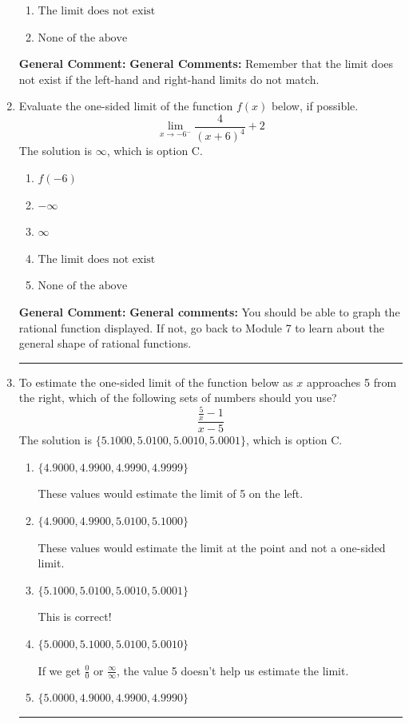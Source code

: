 \documentclass{extbook}[14pt]
\newcommand{\litem}[1]{\item #1

\rule{\textwidth}{0.4pt}}
\begin{document}
\begin{enumerate}
{\begin{enumerate}[label=\Alph*.]
\item \( \text{The limit does not exist} \)


\item \( \text{None of the above} \)


\end{enumerate}

\textbf{General Comment:} \textbf{General Comments:} Remember that the limit does not exist if the left-hand and right-hand limits do not match.
}
\litem{
Evaluate the one-sided limit of the function $f(x)$ below, if possible.
\[ \lim_{x \rightarrow -6^-} \frac{4}{(x+6)^4}+2 \]The solution is \( \infty \), which is option C.\begin{enumerate}[label=\Alph*.]
\item \( f(-6) \)


\item \( -\infty \)


\item \( \infty \)


\item \( \text{The limit does not exist} \)


\item \( \text{None of the above} \)


\end{enumerate}

\textbf{General Comment:} \textbf{General comments:} You should be able to graph the rational function displayed. If not, go back to Module 7 to learn about the general shape of rational functions.
}
\litem{
To estimate the one-sided limit of the function below as $x$ approaches 5 from the right, which of the following sets of numbers should you use?
\[ \frac{\frac{5}{x} - 1}{x - 5} \]The solution is \( \{ 5.1000, 5.0100, 5.0010, 5.0001 \} \), which is option C.\begin{enumerate}[label=\Alph*.]
\item \( \{ 4.9000, 4.9900, 4.9990, 4.9999 \} \)

These values would estimate the limit of 5 on the left.
\item \( \{ 4.9000, 4.9900, 5.0100, 5.1000 \} \)

These values would estimate the limit at the point and not a one-sided limit.
\item \( \{ 5.1000, 5.0100, 5.0010, 5.0001 \} \)

This is correct!
\item \( \{ 5.0000, 5.1000, 5.0100, 5.0010 \} \)

If we get $\frac{0}{0}$ or $\frac{\infty}{\infty}$, the value 5 doesn't help us estimate the limit.
\item \( \{ 5.0000, 4.9000, 4.9900, 4.9990 \} \)


\end{enumerate}}
\end{enumerate}
\end{document}
